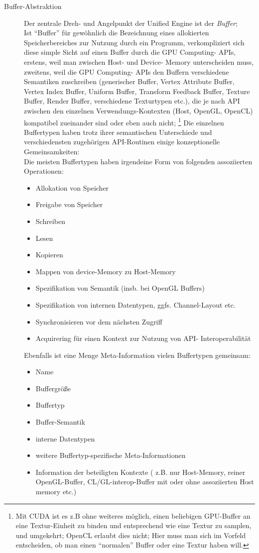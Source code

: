 \begin{description}
	\item[Buffer-Abstraktion]
	Der zentrale Dreh- und Angelpunkt der Unified Engine ist der \emph{Buffer};\\
	Ist "`Buffer"' für gewöhnlich die Bezeichnung eines allokierten Speicherbereiches zur Nutzung durch ein Programm,
	verkompliziert sich diese simple Sicht auf einen Buffer durch die GPU Computing- APIs, erstens, weil man zwischen
	Host- und Device- Memory unterscheiden muss, zweitens, weil die GPU Computing- APIs den Buffern verschiedene Semantiken
	zuschreiben (generischer Buffer, Vertex Attribute Buffer, Vertex Index Buffer, Uniform Buffer, 
	Transform Feedback Buffer, Texture Buffer, Render Buffer, verschiedene Texturtypen etc.), 
	die je nach API zwischen den einzelnen Verwendungs-Kontexten (Host, OpenGL, OpenCL) 
	kompatibel zueinander sind oder eben auch nicht;
	\footnote{Mit CUDA ist es z.B ohne weiteres möglich, einen beliebigen GPU-Buffer an eine Textur-Einheit zu binden und 	
	entsprechend wie eine Textur zu samplen, und umgekehrt; OpenCL erlaubt dies nicht; Hier muss man sich im Vorfeld 
	entscheiden, ob man einen "`normalen"' Buffer oder eine Textur haben will.}
	Die einzelnen Buffertypen haben trotz ihrer semantischen Unterschiede und verschiedensten zugehörigen API-Routinen
	einige konzeptionelle Gemeinsamkeiten:\\
	Die meisten Buffertypen haben irgendeine Form von folgenden assoziierten Operationen:
	\begin{itemize}
		\item Allokation von Speicher
		\item Freigabe von Speicher
		\item Schreiben
		\item Lesen
		\item Kopieren
		\item Mappen von device-Memory zu Host-Memory
		\item Spezifikation von Semantik (insb. bei OpenGL Buffers)
		\item Spezifikation von internen Datentypen, ggfs. Channel-Layout etc.
		\item Synchronisieren vor dem nächsten Zugriff
		\item Acquirering für einen Kontext zur Nutzung von API- Interoperabilität	
	\end{itemize}
	Ebenfalls ist eine Menge Meta-Information vielen Buffertypen gemeinsam:
	\begin{itemize}
		\item Name
		\item Buffergröße
		\item Buffertyp
		\item Buffer-Semantik
		\item interne Datentypen
		\item weitere Buffertyp-spezifische Meta-Informationen
		\item Information der beteiligten Kontexte ( z.B. nur Host-Memory, reiner OpenGL-Buffer, 
				CL/GL-interop-Buffer mit oder ohne assoziierten Host memory etc.)
	\end{itemize}
	

\end{description}
